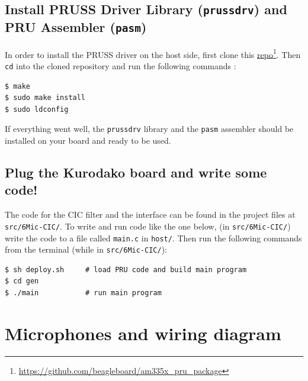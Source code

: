 \documentclass[]{report}
\begin{document}
\hypertarget{install-pruss-driver-library-prussdrv-and-pru-assembler-pasm}{%
\subsection{\texorpdfstring{Install PRUSS Driver Library
(\texttt{prussdrv}) and PRU Assembler
(\texttt{pasm})}{Install PRUSS Driver Library (prussdrv) and PRU Assembler (pasm)}}\label{install-pruss-driver-library-prussdrv-and-pru-assembler-pasm}}

In order to install the PRUSS driver on the host side, first clone this
\href{https://github.com/beagleboard/am335x_pru_package}{repo}\footnote{\url{https://github.com/beagleboard/am335x_pru_package}}. Then
\texttt{cd} into the cloned repository and run the following commands :

\begin{verbatim}
$ make
$ sudo make install
$ sudo ldconfig
\end{verbatim}

If everything went well, the \texttt{prussdrv} library and the
\texttt{pasm} assembler should be installed on your board and ready to
be used.

\hypertarget{plug-the-octopus-board-and-write-some-code}{%
\subsection{Plug the Kurodako board and write some
code!}\label{plug-the-octopus-board-and-write-some-code}}

The code for the CIC filter and the interface can be found in the project files at
\texttt{src/6Mic-CIC/}. To write and run code like the one below, (in \texttt{src/6Mic-CIC/})
write the code to a file called \texttt{main.c} in \texttt{host/}. Then run the following commands from the terminal (while in \texttt{src/6Mic-CIC/}):

\begin{verbatim}
$ sh deploy.sh     # load PRU code and build main program
$ cd gen
$ ./main           # run main program
\end{verbatim}



\hypertarget{microphones-and-wiring-diagram}{%
\section{Microphones and wiring
diagram}\label{microphones-and-wiring-diagram}}
\end{document}
